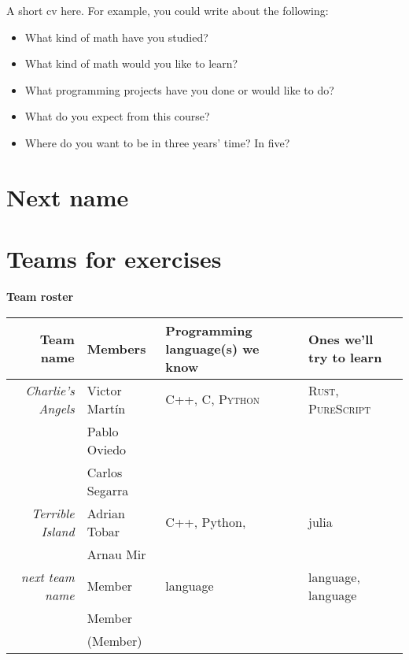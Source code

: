 \documentclass[11pt]{amsart}
\begin{document}
A short cv here. For example, you could write about the following:

\begin{itemize}
\item What kind of math have you studied?
\item What kind of math would you like to learn?
\item What programming projects have you done or would like to do?
\item What do you expect from this course?
\item Where do you want to be in three years' time? In five?
\end{itemize}


\medskip

\section*{Next name}


\newpage
\section*{Teams for exercises}

\begin{center}
  \textbf{\sffamily Team roster}
\end{center}

\bigskip
\begin{center}
  \begin{tabular}[c]{r|l|l|l}
    Team name
    & Members
    & Programming language(s) we know
    & Ones we'll try to learn
    \\\hline
    \emph{Charlie's Angels}
    & Victor Mart\'in
      & \textsc{C++}, \textsc{C}, \textsc{Python} & \textsc{Rust}, \textsc{PureScript} \\
      & Pablo Oviedo & \\
      & Carlos Segarra &               
    \\\hline
    \emph{Terrible Island}
    & Adrian Tobar
    & C++, Python, & julia \\
    & Arnau Mir &
    \\\hline
    \emph{next team name}
    & Member
    & language  & language, language  \\
    & Member \\
    & (Member)                
    
  \end{tabular}
\end{center}
\end{document}
